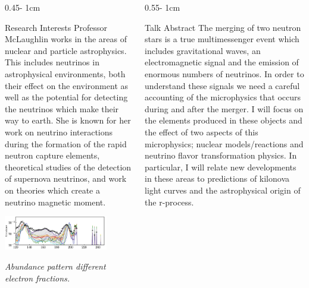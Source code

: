 \documentclass{../psuposter}
\begin{document}
\begin{frame}
\begin{columns}[t, totalwidth=\textwidth]
\begin{column}{0.45\textwidth - 1cm}
    \begin{block}{Research Interests}
        Professor McLaughlin works in the areas of nuclear and particle astrophysics. This includes neutrinos in astrophysical environments, both their effect on the environment as well as the potential for detecting the neutrinos which make their way to earth. She is known for her work on neutrino interactions during the formation of the rapid neutron capture elements, theoretical studies of the detection of supernova neutrinos, and work on theories which create a neutrino magnetic moment.    
        \begin{center}
	    	\includegraphics[width=0.8\textwidth]{images/research}   
	    	
	    	\textit{Abundance pattern different electron fractions. \cite{zhuModelingKilonovaLight2020}} 		
    	\end{center}
    	
    \end{block}
\end{column}
\begin{column}{0.55\textwidth - 1cm}


    \begin{block}{Talk Abstract}
    	The merging of two neutron stars is a true multimessenger event which includes gravitational waves, an electromagnetic signal and the emission of enormous numbers of neutrinos. In order to understand these signals we need a careful accounting of the microphysics that occurs during and after the merger. I will focus on the elements produced in these objects and the effect of two aspects of this microphysics; nuclear models/reactions and neutrino flavor transformation physics.  In particular, I will relate new developments in these areas to predictions of kilonova light curves and the astrophysical origin of the r-process.
    \end{block}



\end{column}
\end{columns}
\end{frame}
\end{document}
